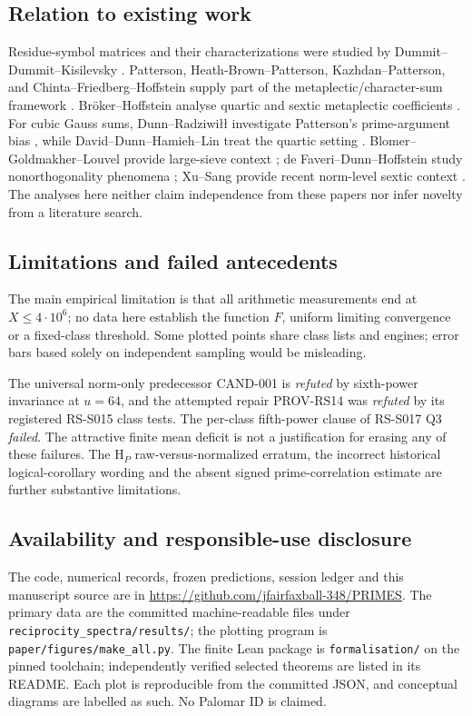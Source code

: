 \subsection{Relation to existing work}
Residue-symbol matrices and their
characterizations were studied by
Dummit--Dummit--Kisilevsky \cite{ddk2016}.
Patterson, Heath-Brown--Patterson,
Kazhdan--Patterson, and
Chinta--Friedberg--Hoffstein supply part
of the metaplectic/character-sum framework
\cite{patterson1987,hbp1979,kazhdan1984,chinta2003}.
Br\"oker--Hoffstein analyse quartic and
sextic metaplectic coefficients
\cite{broeker2013}. For cubic Gauss sums,
Dunn--Radziwi\l{}\l{} investigate
Patterson's prime-argument bias
\cite{dunn2024}, while David--Dunn--Hamieh--Lin
treat the quartic setting \cite{ddhl2023}.
Blomer--Goldmakher--Louvel provide
large-sieve context \cite{bgl2014};
de Faveri--Dunn--Hoffstein study
nonorthogonality phenomena
\cite{dfdh2026}; Xu--Sang provide recent
norm-level sextic context \cite{xusang2026}.
The analyses here neither claim
independence from these papers nor
infer novelty from a literature search.

\subsection{Limitations and failed antecedents}
The main empirical limitation is that all
arithmetic measurements end at
\(X\le4\cdot10^6\); no data here establish
the function \(F\), uniform limiting
convergence or a fixed-class threshold.
Some plotted points share class lists and
engines; error bars based solely on
independent sampling would be misleading.

The universal norm-only predecessor
CAND-001 is \emph{refuted} by sixth-power
invariance at \(u=64\), and the attempted
repair PROV-RS14 was \emph{refuted} by its
registered RS-S015 class tests.
The per-class fifth-power clause of
RS-S017 Q3 \emph{failed}. The attractive
finite mean deficit is not a justification
for erasing any of these failures.
The H\(_P\) raw-versus-normalized erratum,
the incorrect historical logical-corollary
wording and the absent signed prime-correlation
estimate are further substantive limitations.

\subsection{Availability and responsible-use disclosure}
The code, numerical records, frozen predictions,
session ledger and this manuscript source are in
\url{https://github.com/jfairfaxball-348/PRIMES}.
The primary data are the committed machine-readable
files under \texttt{reciprocity\_spectra/results/};
the plotting program is
\texttt{paper/figures/make\_all.py}. The finite Lean
package is \texttt{formalisation/} on the pinned
toolchain; independently verified selected theorems
are listed in its README. Each plot is reproducible
from the committed JSON, and conceptual diagrams
are labelled as such. No Palomar ID is claimed.

